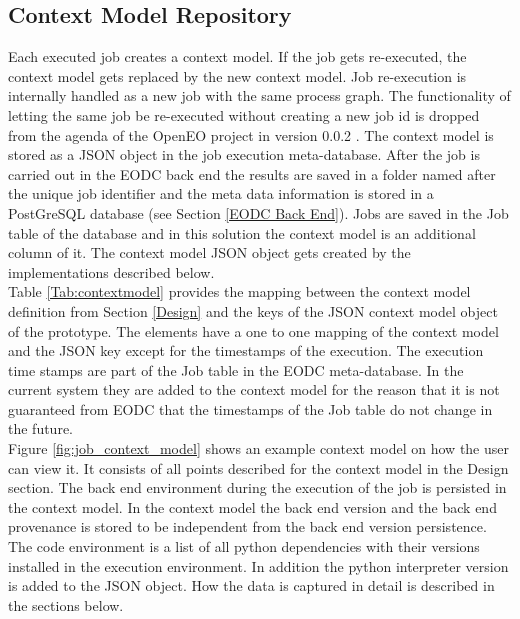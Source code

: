 \documentclass[draft,final]{vutinfth} %
\begin{document}
\subsection{Context Model Repository}\label{Implementation:Provenance Repository}
Each executed job creates a context model. If the job gets re-executed, the context model gets replaced by the new context model. Job re-execution is internally handled as a new job with the same process graph. The functionality of letting the same job be re-executed without creating a new job id is dropped from the agenda of the OpenEO project in version 0.0.2 \cite{openeo_api_desc}. 
The context model is stored as a JSON object in the job execution meta-database. After the job is carried out in the EODC back end the results are saved in a folder named after the unique job identifier and the meta data information is stored in a PostGreSQL database (see Section \ref{EODC Back End}). Jobs are saved in the Job table of the database and in this solution the context model is an additional column of it. The context model JSON object gets created by the implementations described below. \\
Table \ref{Tab:contextmodel} provides the mapping between the context model definition from Section \ref{Design} and the keys of the JSON context model object of the prototype. The elements have a one to one mapping of the context model and the JSON key except for the timestamps of the execution. The execution time stamps are part of the Job table in the EODC meta-database. In the current system they are added to the context model for the reason that it is not guaranteed from EODC that the timestamps of the Job table do not change in the future.\\
Figure \ref{fig:job_context_model} shows an example context model on how the user can view it. It consists of all points described for the context model in the Design section. The back end environment during the execution of the job is persisted in the context model. In the context model the back end version and the back end provenance is stored to be independent from the back end version persistence. The code environment is a list of all python dependencies with their versions installed in the execution environment. In addition the python interpreter version is added to the JSON object. How the data is captured in detail is described in the sections below.    
 
 
 
\end{document}
